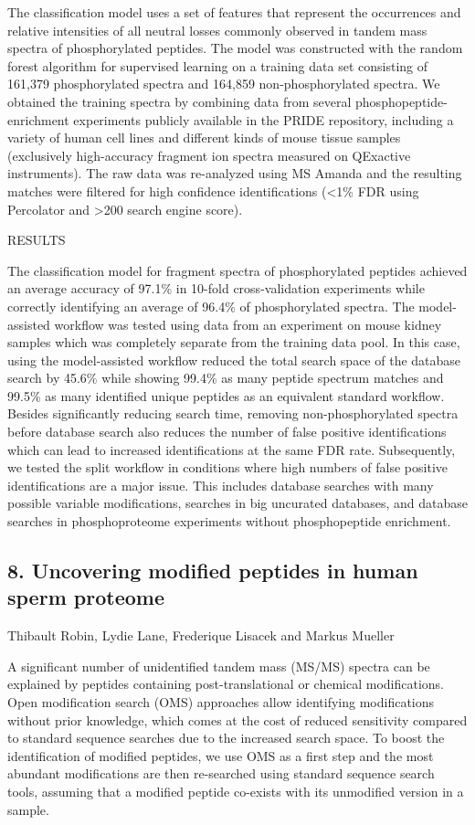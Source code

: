 The classification model uses a set of features that represent the occurrences and relative intensities of all neutral losses commonly observed in tandem mass spectra of phosphorylated peptides. The model was constructed with the random forest algorithm for supervised learning on a training data set consisting of 161,379 phosphorylated spectra and 164,859 non-phosphorylated spectra. We obtained the training spectra by combining data from several phosphopeptide-enrichment experiments publicly available in the PRIDE repository, including a variety of human cell lines and different kinds of mouse tissue samples (exclusively high-accuracy fragment ion spectra measured on QExactive instruments). The raw data was re-analyzed using MS Amanda and the resulting matches were filtered for high confidence identifications (<1\% FDR using Percolator and >200 search engine score).


RESULTS

The classification model for fragment spectra of phosphorylated peptides achieved an average accuracy of 97.1\% in 10-fold cross-validation experiments while correctly identifying an average of 96.4\% of phosphorylated spectra. The model-assisted workflow was tested using data from an experiment on mouse kidney samples which was completely separate from the training data pool. In this case, using the model-assisted workflow reduced the total search space of the database search by 45.6\% while showing 99.4\% as many peptide spectrum matches and 99.5\% as many identified unique peptides as an equivalent standard workflow. Besides significantly reducing search time, removing non-phosphorylated spectra before database search also reduces the number of false positive identifications which can lead to increased identifications at the same FDR rate. Subsequently, we tested the split workflow in conditions where high numbers of false positive identifications are a major issue. This includes database searches with many possible variable modifications, searches in big uncurated databases, and database searches in phosphoproteome experiments without phosphopeptide enrichment.

\subsection*{\color{eubicRed} 8. Uncovering modified peptides in human sperm proteome}
{\color{eubicGray}Thibault Robin, Lydie Lane, Frederique Lisacek and Markus Mueller}

A significant number of unidentified tandem mass (MS/MS) spectra can be explained by peptides containing post-translational or chemical modifications. Open modification search (OMS) approaches allow identifying modifications without prior knowledge, which comes at the cost of reduced sensitivity compared to standard sequence searches due to the increased search space. To boost the identification of modified peptides, we use OMS as a first step and the most abundant modifications are then re-searched using standard sequence search tools, assuming that a modified peptide co-exists with its unmodified version in a sample.

